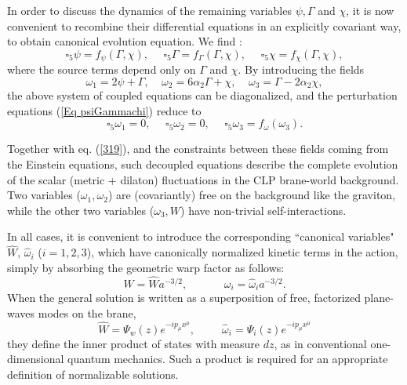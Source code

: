 \documentclass[a4paper,12pt]{article}
\begin{document}
In order to discuss the dynamics of the remaining variables $\psi,
\Gamma$ and $\chi$, it is now convenient to recombine their
differential equations in an explicitly covariant way,  to obtain
canonical evolution equation. We find :
\begin{equation}
\square_5 \psi = f_{\psi}(\Gamma,\chi), ~~~~~~ \square_5 \Gamma =
f_{\Gamma}(\Gamma,\chi), ~~~~~~ \square_5 \chi =
f_{\chi}(\Gamma,\chi),
\label{Eq psiGammachi}
\end{equation}
where the source terms
 depend only on $\Gamma$ and $\chi$. By introducing the fields
\begin{equation}
\omega_1=2\psi+ \Gamma, ~~~~~ \omega_2=6\alpha_2 \Gamma +\chi,
~~~~~ \omega_3=\Gamma- 2\alpha_2 \chi, \label{323}
\end{equation}
the above system of coupled equations can be diagonalized, and the
perturbation equations (\ref{Eq psiGammachi}) reduce to
\begin{equation}
\square_5 \omega_1=0, ~~~~~~ \square_5 \omega_2=0 , ~~~~~~
\square_5 \omega_3= f_\omega (\omega_3).  \label{Eq omega}
\end{equation}

Together with eq. (\ref{319}), and the constraints between these
fields coming from the Einstein equations, such decoupled
equations describe the complete evolution of the scalar (metric +
dilaton) fluctuations in the CLP brane-world background. Two
variables ($\omega_1, \omega_2$) are (covariantly) free on the
background like the graviton, while the other two variables
($\omega_3, W$) have non-trivial self-interactions.

In all cases, it is convenient to introduce the corresponding ``canonical
variables" $\hat W$, $\hat \omega_i$ ($i=1,2,3$), which have
canonically normalized   kinetic terms \cite{MBF} in the action,
simply by absorbing the geometric warp factor as follows:
\begin{equation}
W= \hat W a^{-3/2}, ~~~~~~~~~~~~~~~ \omega_i= \hat \omega_i
a^{-3/2}. \label{328}
\end{equation}
When the general solution is written as a  superposition of free,
factorized plane-waves modes on the brane,
\begin{equation}
\hat W= \Psi_w(z)  e^{-ip_\mu x^\mu}, ~~~~~~~~~~~ \hat \omega_i=
\Psi_i(z) e^{-ip_\mu x^\mu}
\label{329}
\end{equation}
they define the inner product of states with measure $dz$, as in
conventional one-dimensional quantum mechanics. Such a product is
required for an appropriate definition of normalizable solutions.
\end{document}
